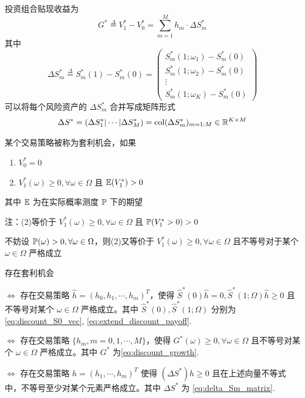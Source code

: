 投资组合贴现收益为
\begin{equation}
G^*\overset{\Delta}{=}V_1^*-V_0^*=\sum_{m=1}^M h_m\cdot \Delta S_m^*
\label{eq:discount_growth}
\end{equation}
其中
\begin{equation}
\Delta S_m^*\overset{\Delta}{=} S_m^*(1)-S_m^*(0)=\begin{pmatrix}
    S_m^*(1;\omega_1)-S_m^*(0)\\
    S_m^*(1;\omega_2)-S_m^*(0)\\
    \vdots\\
    S_m^*(1;\omega_K)-S_m^*(0)
\end{pmatrix}
\label{eq:delta_Sm}
\end{equation}
可以将每个风险资产的 $\Delta S_m^*$ 合并写成矩阵形式
\begin{equation}
\Delta S^*=(\Delta S_1^* | \cdots | \Delta S_M^*)=\text{col}(\Delta S_m^*)_{m=1:M}\in \mathbb{R}^{K\times M}
\label{eq:delta_Sm_matrix}
\end{equation}

\begin{definition}[套利机会]
    某个交易策略被称为套利机会，如果
    \begin{enumerate}
        \item $V_0^*=0$
        \item $V_1^*(\omega)\geq 0, \forall \omega\in \Omega$ 且 $\mathbb E(V_1^*)>0$
    \end{enumerate}
    其中 $\mathbb E$ 为在实际概率测度 $\mathbb{P}$ 下的期望
\end{definition}

注：(2)等价于 $V_1^*(\omega)\geq 0, \forall \omega\in \Omega$ 且 $\mathbb{P}(V_1^*>0)>0$

不妨设 $\mathbb{P}(\omega)>0,\forall \omega\in \Omega$，则(2)又等价于 $V_1^*(\omega)\geq 0, \forall \omega\in \Omega$ 且不等号对于某个 $\omega\in \Omega$ 严格成立

\begin{lemma}[套利机会等价条件]
    存在套利机会

    $\Leftrightarrow$ 存在交易策略 $\hat{h}=(h_0,h_1,\cdots,h_m)^T$，使得 $\hat{S}^*(0)\hat{h}=0, \hat{S}^*(1;\Omega)\hat{h}\geq 0$ 且不等号对某个 $\omega\in \Omega$ 严格成立。其中 $\hat{S}^*(0),\hat{S}^*(1;\Omega)$ 分别为\eqref{eq:discount_S0_vec}, \eqref{eq:extend_discount_payoff}.

    $\Leftrightarrow$ 存在交易策略 $\{h_m,m=0,1,\cdots,M\}$，使得 $G^*(\omega)\geq 0, \forall \omega\in \Omega$ 且不等号对某个 $\omega\in \Omega$ 严格成立。其中 $G^*$ 为\eqref{eq:discount_growth}.

    $\Leftrightarrow$ 存在交易策略 $h=(h_1,\cdots,h_m)^T$ 使得 $(\Delta S^*)h\geq 0$ 且在上述向量不等式中，不等号至少对某个元素严格成立。其中 $\Delta S^*$ 为 \eqref{eq:delta_Sm_matrix}.
\end{lemma}

